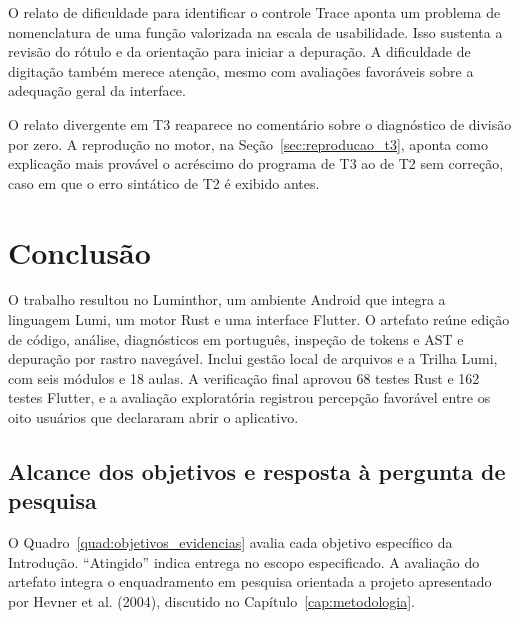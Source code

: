 \documentclass[
    12pt
    ,oneside
    ,a4paper
    ,chapter=TITLE
    ,section=TITLE
    ,sumario=abnt-6027-2012]{abntex2}
\begin{document}


O relato de dificuldade para identificar o controle Trace aponta um problema de
nomenclatura de uma função valorizada na escala de usabilidade. Isso sustenta a revisão do rótulo e da
orientação para iniciar a depuração. A dificuldade de digitação também merece atenção, mesmo com avaliações favoráveis sobre a adequação geral da interface.

O relato divergente em T3 reaparece no comentário sobre o diagnóstico de divisão por
zero. A reprodução no motor, na Seção~\ref{sec:reproducao_t3}, aponta como explicação mais provável o acréscimo do programa de T3 ao de T2 sem correção, caso em que o erro sintático de T2 é exibido antes.



\chapter{Conclusão}
\label{cap:conclusao}

O trabalho resultou no Luminthor, um ambiente Android que integra a linguagem
Lumi, um motor Rust e uma interface Flutter. O artefato reúne edição de código,
análise, diagnósticos em português, inspeção de tokens e AST e depuração por
rastro navegável. Inclui gestão local de arquivos e a Trilha Lumi, com seis
módulos e 18 aulas. A verificação final aprovou 68 testes Rust e 162 testes
Flutter, e a avaliação exploratória registrou percepção favorável entre os
oito usuários que declararam abrir o aplicativo.

\section{Alcance dos objetivos e resposta à pergunta de pesquisa}

O Quadro~\ref{quad:objetivos_evidencias} avalia cada objetivo específico da
Introdução. ``Atingido'' indica entrega no escopo especificado.
A avaliação do artefato integra o enquadramento em pesquisa orientada a projeto
apresentado por Hevner et al. (2004), discutido no Capítulo~\ref{cap:metodologia}.
\end{document}
